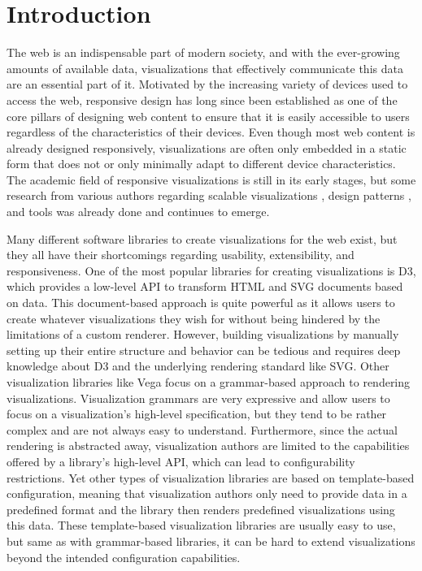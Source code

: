 \chapter{Introduction}
\label{chap:Introduction}

The web is an indispensable part of modern society, and with the ever-growing amounts of available data, visualizations that effectively communicate this data are an essential part of it.
Motivated by the increasing variety of devices used to access the web, responsive design has long since been established as one of the core pillars of designing web content to ensure that it is easily accessible to users regardless of the characteristics of their devices.
Even though most web content is already designed responsively, visualizations are often only embedded in a static form that does not or only minimally adapt to different device characteristics. 
The academic field of responsive visualizations is still in its early stages, but some research from various authors regarding scalable visualizations \parencite{BuildingRespDataVisForTheWeb, LearningRespDataVis}, design patterns \parencite{RespVis, TechniquesForFlexibleRespVisDesign, DesignPatternsTradeOffsRespVis}, and tools \parencite{TechniquesForFlexibleRespVisDesign} was already done and continues to emerge.

Many different software libraries to create visualizations for the web exist, but they all have their shortcomings regarding usability, extensibility, and responsiveness.
One of the most popular libraries for creating visualizations is D3, which provides a low-level API to transform HTML and SVG documents based on data.
This document-based approach is quite powerful as it allows users to create whatever visualizations they wish for without being hindered by the limitations of a custom renderer.
However, building visualizations by manually setting up their entire structure and behavior can be tedious and requires deep knowledge about D3 and the underlying rendering standard like SVG.
Other visualization libraries like Vega \parencite{Vega} focus on a grammar-based approach to rendering visualizations.
Visualization grammars are very expressive and allow users to focus on a visualization's high-level specification, but they tend to be rather complex and are not always easy to understand.
Furthermore, since the actual rendering is abstracted away, visualization authors are limited to the capabilities offered by a library's high-level API, which can lead to configurability restrictions.
Yet other types of visualization libraries are based on template-based configuration, meaning that visualization authors only need to provide data in a predefined format and the library then renders predefined visualizations using this data.
These template-based visualization libraries are usually easy to use, but same as with grammar-based libraries, it can be hard to extend visualizations beyond the intended configuration capabilities.

